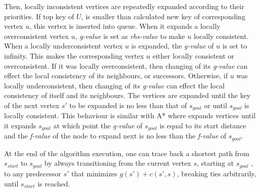 \documentclass[10pt,journal]{IEEEtran}
\begin{document}
Then, locally inconsistent vertices are repeatedly expanded according to their priorities. If top key of $U$, is smaller than calculated new key of corresponding vertex $u$, this vertex is inserted into queue. When it expands a locally overconsistent vertex $u$, \textit{g-value} is set as \textit{rhs-value} to make $u$ locally consistent. When a locally underconsistent vertex $u$ is expanded, the \textit{g-value} of $u$ is set to infinity. This makes the corresponding vertex $u$ either locally consistent or overconsistent. If it was locally overconsistent, then changing of its \textit{g-value} can effect the local consistency of its neighbours, or successors. Otherwise, if $u$ was locally underconsistent, then changing of its \textit{g-value} can effect the local consistency of itself and its neighbours. The vertices are expanded until the key of the next vertex $s'$ to be expanded is no less than that of $s_{goal}$ or until $s_{goal}$ is locally consistent. This behaviour is similar with A* where expands vertices until it expands $s_{goal}$ at which point the \textit{g-value} of $s_{goal}$ is equal to its start distance and the \textit{f-value} of the node to expand next is no less than the \textit{f-value} of $s_{goal}$.

At the end of the algorithm execution, one can trace back a shortest path from $s_{start}$ to $s_{goal}$ by always transitioning from the current vertex $s$, starting at $s_{goal}$ , to any predecessor $s'$ that minimizes $g(s') + c(s',s)$, breaking ties arbitrarily, until $s_{start}$ is reached.
\end{document}
